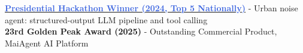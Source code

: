   \href{https://english.president.gov.tw/News/6881}{\textcolor{RoyalBlue}{\textbf{Presidential Hackathon Winner (2024, Top 5 Nationally)}}} - Urban noise agent: structured-output LLM pipeline and tool calling
  \\ \textbf{23rd Golden Peak Award (2025)} - Outstanding Commercial Product, MaiAgent AI Platform
